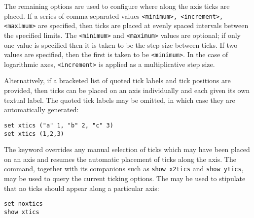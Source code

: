 The remaining options are used to configure where along the axis ticks are
placed. If a series of comma-separated values {\tt <minimum>, <increment>,
<maximum>} are specified, then ticks are placed at evenly spaced intervals
between the specified limits. The {\tt <minimum>} and {\tt <maximum>} values
are optional; if only one value is specified then it is taken to be the step
size between ticks. If two values are specified, then the first is taken to be
{\tt <minimum>}. In the case of logarithmic axes, {\tt <increment>} is applied
as a multiplicative step size.

Alternatively, if a bracketed list of quoted tick labels and tick positions are
provided, then ticks can be placed on an axis individually and each given its
own textual label. The quoted tick labels may be omitted, in which case they
are automatically generated:
\begin{verbatim}
set xtics ("a" 1, "b" 2, "c" 3)
set xtics (1,2,3)
\end{verbatim}
The keyword  overrides any manual selection of ticks which
may have been placed on an axis and resumes the automatic placement of ticks
along the axis. The  command, together with its companions
such as {\tt show x2tics} and {\tt show ytics}, may be used to query the
current ticking options. The  may be used to stipulate
that no ticks should appear along a particular axis:

\begin{verbatim}
set noxtics
show xtics
\end{verbatim}

